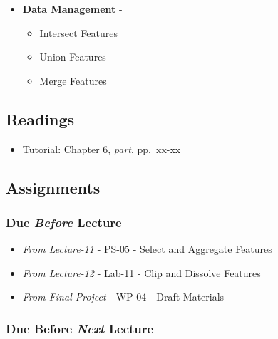 \documentclass[]{book}
\providecommand{\tightlist}{%
  \setlength{\itemsep}{0pt}\setlength{\parskip}{0pt}}
\begin{document}
\begin{itemize}
\tightlist
\item
  \textbf{Data Management} -

  \begin{itemize}
  \tightlist
  \item
    Intersect Features
  \item
    Union Features
  \item
    Merge Features
  \end{itemize}
\end{itemize}

\hypertarget{readings-13}{%
\subsection*{Readings}\label{readings-13}}

\begin{itemize}
\tightlist
\item
  Tutorial: Chapter 6, \emph{part}, pp.~xx-xx
\end{itemize}

\hypertarget{assignments-14}{%
\subsection*{Assignments}\label{assignments-14}}

\hypertarget{due-before-lecture-12}{%
\subsubsection*{\texorpdfstring{Due \emph{Before} Lecture}{Due Before Lecture}}\label{due-before-lecture-12}}

\begin{itemize}
\tightlist
\item
  \emph{From Lecture-11} - PS-05 - Select and Aggregate Features
\item
  \emph{From Lecture-12} - Lab-11 - Clip and Dissolve Features
\item
  \emph{From Final Project} - WP-04 - Draft Materials
\end{itemize}

\hypertarget{due-before-next-lecture-11}{%
\subsubsection*{\texorpdfstring{Due Before \emph{Next} Lecture}{Due Before Next Lecture}}\label{due-before-next-lecture-11}}
\end{document}
